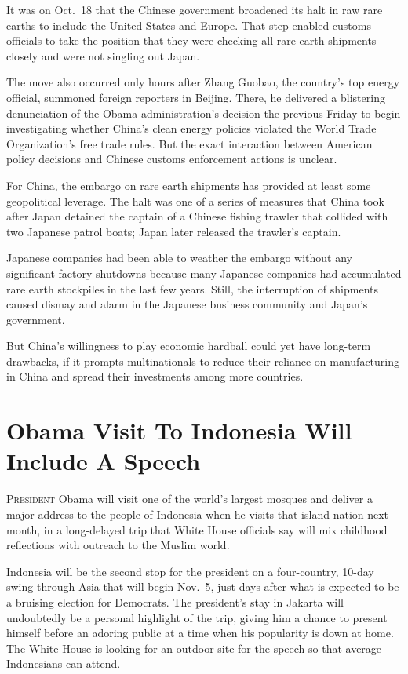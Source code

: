 ﻿\documentclass[12pt]{article}
\begin{document}
It was on Oct.~18 that the Chinese government broadened its halt in raw rare earths to include the
United States and Europe. That step enabled customs officials to take the position that they were
checking all rare earth shipments closely and were not singling out Japan.

The move also occurred only hours after Zhang Guobao, the country's top energy official, summoned
foreign reporters in Beijing. There, he delivered a blistering denunciation of the Obama
administration's decision the previous Friday to begin investigating whether China's clean energy
policies violated the World Trade Organization's free trade rules. But the exact interaction between
American policy decisions and Chinese customs enforcement actions is unclear.

For China, the embargo on rare earth shipments has provided at least some geopolitical leverage. The
halt was one of a series of measures that China took after Japan detained the captain of a Chinese
fishing trawler that collided with two Japanese patrol boats; Japan later released the trawler's
captain.

Japanese companies had been able to weather the embargo without any significant factory shutdowns
because many Japanese companies had accumulated rare earth stockpiles in the last few years. Still,
the interruption of shipments caused dismay and alarm in the Japanese business community and Japan's
government.

But China's willingness to play economic hardball could yet have long-term drawbacks, if it prompts
multinationals to reduce their reliance on manufacturing in China and spread their investments among
more countries.

\section{Obama Visit To Indonesia Will Include A Speech}

\lettrine{P}{resident} Obama will visit one of the world's largest mosques
and deliver a major address to the people of Indonesia when he visits that island nation next month,
in a long-delayed trip that White House officials say will mix childhood reflections with outreach
to the Muslim world.

Indonesia will be the second stop for the president on a four-country, 10-day swing through Asia
that will begin Nov.~5, just days after what is expected to be a bruising election for Democrats.
The president's stay in Jakarta will undoubtedly be a personal highlight of the trip, giving him a
chance to present himself before an adoring public at a time when his popularity is down at home.
The White House is looking for an outdoor site for the speech so that average Indonesians can
attend.
\end{document}
